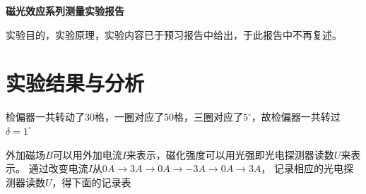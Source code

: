 \documentclass[a4paper,UTF8]{ctexart}
\begin{document}
\begin{center}
    \textbf{\Large 磁光效应系列测量实验报告}
    \par {}
\end{center}

实验目的，实验原理，实验内容已于预习报告中给出，于此报告中不再复述。

\section{实验结果与分析}

检偏器一共转动了30格，一圈对应了50格，三圈对应了$5^{\circ}$，故检偏器一共转过$\delta = 1^{\circ}$

外加磁场$B$可以用外加电流$I$来表示，磁化强度可以用光强即光电探测器读数$U$来表示。
通过改变电流$I$从$0A \rightarrow 3A \rightarrow 0A \rightarrow -3A \rightarrow 0A \rightarrow 3A$，
记录相应的光电探测器读数$U$，得下面的记录表
\end{document}
